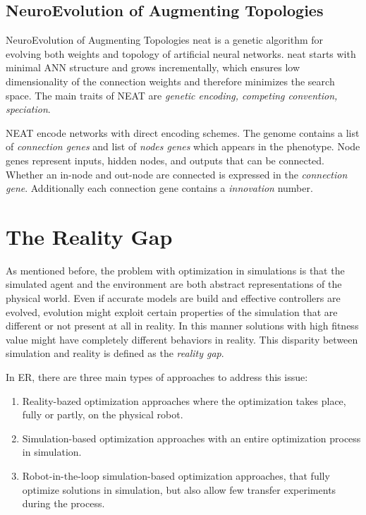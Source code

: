 \subsection{NeuroEvolution of Augmenting Topologies}

NeuroEvolution of Augmenting Topologies \gls{neat} \cite{stanley2002evolving} is a genetic algorithm for evolving both weights and topology of artificial neural networks. \gls{neat} starts with minimal ANN structure and grows incrementally, which ensures low dimensionality of the connection weights and therefore minimizes the search space. The main traits of NEAT are \emph{genetic encoding, competing convention, speciation}.

NEAT encode networks with direct encoding schemes. The genome contains a list of \emph{connection genes} and list of \emph{nodes genes} which appears in the phenotype. Node genes represent inputs, hidden nodes, and outputs that can be connected. Whether an in-node and out-node are connected is expressed in the \emph{connection gene}. Additionally each connection gene contains a \emph{innovation} number.

\section{The Reality Gap}

As mentioned before, the problem with optimization in simulations is that the simulated agent and the environment are both abstract representations of the physical world. Even if accurate models are build and effective controllers are evolved, evolution might exploit certain properties of the simulation that are different or not present at all in reality. In this manner solutions with high fitness value might have completely different behaviors in reality. This disparity between simulation and reality is defined as the \emph{reality gap}.

In ER, there are three main types of approaches to address this issue:

\begin{enumerate}
    \item Reality-bazed optimization approaches where the optimization takes place, fully or partly, on the physical robot.
    \item Simulation-based optimization approaches with an entire optimization process in simulation.
    \item Robot-in-the-loop simulation-based optimization approaches, that fully optimize solutions in simulation, but also allow few transfer experiments during the process.
\end{enumerate}

